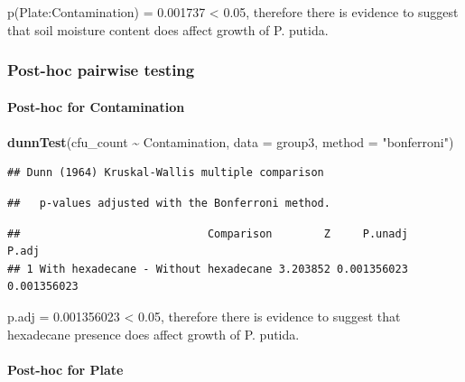 \documentclass[
]{article}
\newenvironment{Shaded}{\begin{snugshade}}{\end{snugshade}}
\newcommand{\AttributeTok}[1]{\textcolor[rgb]{0.13,0.29,0.53}{#1}}
\newcommand{\FunctionTok}[1]{\textcolor[rgb]{0.13,0.29,0.53}{\textbf{#1}}}
\newcommand{\NormalTok}[1]{#1}
\newcommand{\SpecialCharTok}[1]{\textcolor[rgb]{0.81,0.36,0.00}{\textbf{#1}}}
\newcommand{\StringTok}[1]{\textcolor[rgb]{0.31,0.60,0.02}{#1}}
\begin{document}
p(Plate:Contamination) = 0.001737 \textless{} 0.05, therefore there is
evidence to suggest that soil moisture content does affect growth of P.
putida.

\subsubsection{Post-hoc pairwise
testing}\label{post-hoc-pairwise-testing-1}

\paragraph{Post-hoc for
Contamination}\label{post-hoc-for-contamination-1}

\paragraph{}\label{section-3}

\begin{Shaded}
\begin{Highlighting}[]
\FunctionTok{dunnTest}\NormalTok{(cfu\_count }\SpecialCharTok{\textasciitilde{}}\NormalTok{ Contamination, }\AttributeTok{data =}\NormalTok{ group3, }\AttributeTok{method =} \StringTok{"bonferroni"}\NormalTok{)}
\end{Highlighting}
\end{Shaded}

\begin{verbatim}
## Dunn (1964) Kruskal-Wallis multiple comparison
\end{verbatim}

\begin{verbatim}
##   p-values adjusted with the Bonferroni method.
\end{verbatim}

\begin{verbatim}
##                             Comparison        Z     P.unadj       P.adj
## 1 With hexadecane - Without hexadecane 3.203852 0.001356023 0.001356023
\end{verbatim}

p.adj = 0.001356023 \textless{} 0.05, therefore there is evidence to
suggest that hexadecane presence does affect growth of P. putida.

\paragraph{Post-hoc for Plate}\label{post-hoc-for-plate-1}
\end{document}
